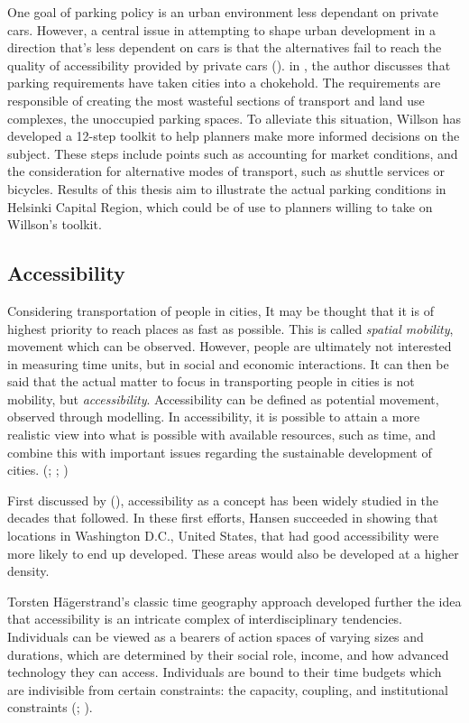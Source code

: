 One goal of parking policy is an urban environment less dependant on private cars. However, a central issue in attempting to shape urban development in a direction that's less dependent on cars is that the alternatives fail to reach the quality of accessibility provided by private cars (\cite{Bertolini2003}). in , the author discusses that parking requirements have taken cities into a chokehold. The requirements are responsible of creating the most wasteful sections of transport and land use complexes, the unoccupied parking spaces. To alleviate this situation, Willson has developed a 12-step toolkit to help planners make more informed decisions on the subject. These steps include points such as accounting for market conditions, and the consideration for alternative modes of transport, such as shuttle services or bicycles. Results of this thesis aim to illustrate the actual parking conditions in Helsinki Capital Region, which could be of use to planners willing to take on Willson's toolkit.

\newpage
\subsection{Accessibility}
\justify

Considering transportation of people in cities, It may be thought that it is of highest priority to reach places as fast as possible. This is called \textit{spatial mobility}, movement which can be observed. However, people are ultimately not interested in measuring time units, but in social and economic interactions. It can then be said that the actual matter to focus in transporting people in cities is not mobility, but \textit{accessibility}. Accessibility can be defined as potential movement, observed through modelling. In accessibility, it is possible to attain a more realistic view into what is possible with available resources, such as time, and combine this with important issues regarding the sustainable development of cities. (\cite{Hodge1997}; \cite{Tenkanen2017}; \cite{Cervero2017})

First discussed by \citeauthor{Hansen1959} (\citeyear{Hansen1959}), accessibility as a concept has been widely studied in the decades that followed. In these first efforts, Hansen succeeded in showing that locations in Washington D.C., United States, that had good accessibility were more likely to end up developed. These areas would also be developed at a higher density.

Torsten Hägerstrand's classic time geography approach developed further the idea that accessibility is an intricate complex of interdisciplinary tendencies. Individuals can be viewed as a bearers of action spaces of varying sizes and durations, which are determined by their social role, income, and how advanced technology they can access. Individuals are bound to their time budgets which are indivisible from certain constraints: the capacity, coupling, and institutional constraints (\cite{Wegener1999}; \cite{Hagerstrand1970}).

